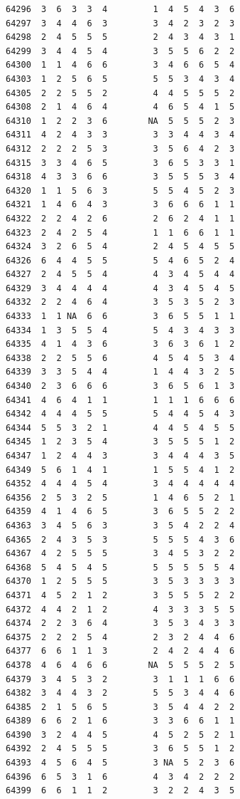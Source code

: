 \documentclass[
  letterpaper,
  DIV=11,
  numbers=noendperiod]{scrreprt}
\begin{document}
\begin{verbatim}
64296  3  6  3  3  4         1  4  5  4  3  6
64297  3  4  4  6  3         3  4  2  3  2  3
64298  2  4  5  5  5         2  4  3  4  3  1
64299  3  4  4  5  4         3  5  5  6  2  2
64300  1  1  4  6  6         3  4  6  6  5  4
64303  1  2  5  6  5         5  5  3  4  3  4
64305  2  2  5  5  2         4  4  5  5  5  2
64308  2  1  4  6  4         4  6  5  4  1  5
64310  1  2  2  3  6        NA  5  5  5  2  3
64311  4  2  4  3  3         3  3  4  4  3  4
64312  2  2  2  5  3         3  5  6  4  2  3
64315  3  3  4  6  5         3  6  5  3  3  1
64318  4  3  3  6  6         3  5  5  5  3  4
64320  1  1  5  6  3         5  5  4  5  2  3
64321  1  4  6  4  3         3  6  6  6  1  1
64322  2  2  4  2  6         2  6  2  4  1  1
64323  2  4  2  5  4         1  1  6  6  1  1
64324  3  2  6  5  4         2  4  5  4  5  5
64326  6  4  4  5  5         5  4  6  5  2  4
64327  2  4  5  5  4         4  3  4  5  4  4
64329  3  4  4  4  4         4  3  4  5  4  5
64332  2  2  4  6  4         3  5  3  5  2  3
64333  1  1 NA  6  6         3  6  5  5  1  1
64334  1  3  5  5  4         5  4  3  4  3  3
64335  4  1  4  3  6         3  6  3  6  1  2
64338  2  2  5  5  6         4  5  4  5  3  4
64339  3  3  5  4  4         1  4  4  3  2  5
64340  2  3  6  6  6         3  6  5  6  1  3
64341  4  6  4  1  1         1  1  1  6  6  6
64342  4  4  4  5  5         5  4  4  5  4  3
64344  5  5  3  2  1         4  4  5  4  5  5
64345  1  2  3  5  4         3  5  5  5  1  2
64347  1  2  4  4  3         3  4  4  4  3  5
64349  5  6  1  4  1         1  5  5  4  1  2
64352  4  4  4  5  4         3  4  4  4  4  4
64356  2  5  3  2  5         1  4  6  5  2  1
64359  4  1  4  6  5         3  6  5  5  2  2
64363  3  4  5  6  3         3  5  4  2  2  4
64365  2  4  3  5  3         5  5  5  4  3  6
64367  4  2  5  5  5         3  4  5  3  2  2
64368  5  4  5  4  5         5  5  5  5  5  4
64370  1  2  5  5  5         3  5  3  3  3  3
64371  4  5  2  1  2         3  5  5  5  2  2
64372  4  4  2  1  2         4  3  3  3  5  5
64374  2  2  3  6  4         3  5  3  4  3  3
64375  2  2  2  5  4         2  3  2  4  4  6
64377  6  6  1  1  3         2  4  2  4  4  6
64378  4  6  4  6  6        NA  5  5  5  2  5
64379  3  4  5  3  2         3  1  1  1  6  6
64382  3  4  4  3  2         5  5  3  4  4  6
64385  2  1  5  6  5         3  5  4  4  2  2
64389  6  6  2  1  6         3  3  6  6  1  1
64390  3  2  4  4  5         4  5  2  5  2  1
64392  2  4  5  5  5         3  6  5  5  1  2
64393  4  5  6  4  5         3 NA  5  2  3  6
64396  6  5  3  1  6         4  3  4  2  2  2
64399  6  6  1  1  2         3  2  2  4  3  5

\end{verbatim}
\end{document}
